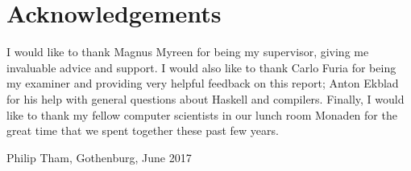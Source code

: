 \thispagestyle{plain}			%
\section*{Acknowledgements}
I would like to thank Magnus Myreen for being my supervisor,
giving me invaluable advice and support. I would also like to thank Carlo Furia
for being my examiner and providing very helpful feedback on this report;
Anton Ekblad for his help with general questions about Haskell and compilers.
Finally, I would like to thank my fellow computer scientists in our lunch room
Monaden for the great time that we spent together these past few years.


\vspace{1.5cm}
\hfill
Philip Tham, Gothenburg, June 2017

\newpage				%
\thispagestyle{empty}
\mbox{}
